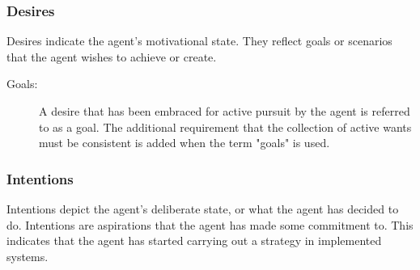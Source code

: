 \subsubsection{Desires}
Desires indicate the agent's motivational state. They reflect goals or scenarios that the agent wishes to achieve or create.

    \begin{description}
        \item[Goals:]
        A desire that has been embraced for active pursuit by the agent is referred to as a goal. The additional requirement that the collection of active wants must be consistent is added when the term "goals" is used.
    \end{description}

\subsubsection{Intentions}
Intentions depict the agent's deliberate state, or what the agent has decided to do. Intentions are aspirations that the agent has made some commitment to. This indicates that the agent has started carrying out a strategy in implemented systems.
    
    \vspace{.5cm}
    
